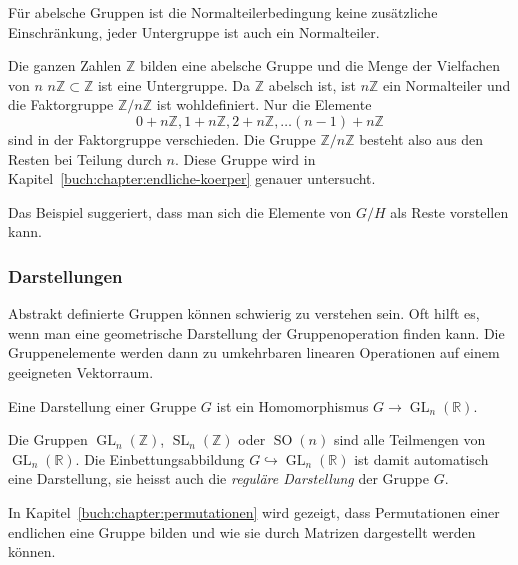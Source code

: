 Für abelsche Gruppen ist die Normalteilerbedingung keine zusätzliche
Einschränkung, jeder Untergruppe ist auch ein Normalteiler.

\begin{beispiel}
Die ganzen Zahlen $\mathbb{Z}$ bilden eine abelsche Gruppe und
die Menge der Vielfachen von $n$
$n\mathbb{Z}\subset\mathbb{Z}$ ist eine Untergruppe.
Da $\mathbb{Z}$ abelsch ist, ist $n\mathbb{Z}$ ein Normalteiler
und die Faktorgruppe $\mathbb{Z}/n\mathbb{Z}$ ist wohldefiniert.
Nur die Elemente
\[
0+n\mathbb{Z},
1+n\mathbb{Z},
2+n\mathbb{Z},
\dots
(n-1)+n\mathbb{Z}
\]
sind in der Faktorgruppe verschieden.
Die Gruppe $\mathbb{Z}/n\mathbb{Z}$ besteht also aus den Resten
bei Teilung durch $n$.
Diese Gruppe wird in Kapitel~\ref{buch:chapter:endliche-koerper}
genauer untersucht.
\end{beispiel}

Das Beispiel suggeriert, dass man sich die Elemente von $G/H$
als Reste vorstellen kann.

\subsubsection{Darstellungen}
Abstrakt definierte Gruppen können schwierig zu verstehen sein.
Oft hilft es, wenn man eine geometrische Darstellung der Gruppenoperation
finden kann.
Die Gruppenelemente werden dann zu umkehrbaren linearen Operationen
auf einem geeigneten Vektorraum.

\begin{definition}
\label{buch:vektorenmatrizen:def:darstellung}
Eine Darstellung einer Gruppe $G$ ist ein Homomorphismus 
$G\to\operatorname{GL}_n(\mathbb{R})$.
\end{definition}

\begin{beispiel}
Die Gruppen $\operatorname{GL}_n(\mathbb{Z})$,
$\operatorname{SL}_n(\mathbb{Z})$ oder $\operatorname{SO}(n)$ 
sind alle Teilmengen von $\operatorname{GL}_n(\mathbb{R})$.
Die Einbettungsabbildung $G\hookrightarrow \operatorname{GL}_n(\mathbb{R})$
ist damit automatisch eine Darstellung, sie heisst auch die
{\em reguläre Darstellung} der Gruppe $G$.
\end{beispiel}

In Kapitel~\ref{buch:chapter:permutationen} wird gezeigt, 
dass Permutationen einer endlichen eine Gruppe bilden und wie
sie durch Matrizen dargestellt werden können.






